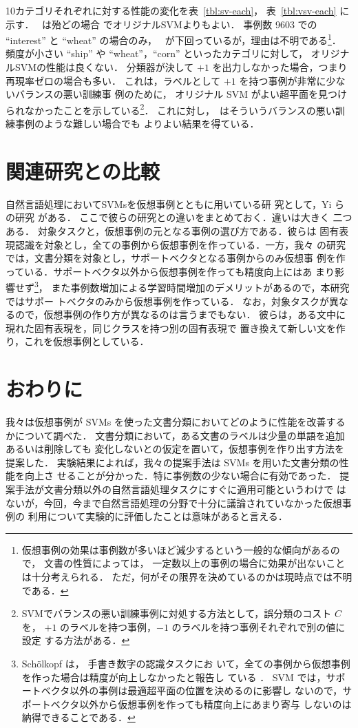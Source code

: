 10カテゴリそれぞれに対する性能の変化を表~\ref{tbl:sv-each}，
表~\ref{tbl:vsv-each} に示す．
\SVMFourVSVs\ は殆どの場合
でオリジナルSVMよりもよい．
事例数 9603 での ``interest'' と ``wheat'' の場合のみ，
\SVMFourVSVs\ が下回っているが，理由は不明である\footnote{
仮想事例の効果は事例数が多いほど減少するという一般的な傾向があるので，
文書の性質によっては，
一定数以上の事例の場合に効果が出ないことは十分考えられる．
ただ，何がその限界を決めているのかは現時点では不明である．
}．
頻度が小さい ``ship'' や ``wheat''，``corn'' といったカテゴリに対して，
オリジナルSVMの性能は良くない．
分類器が決して $+1$ を出力しなかった場合，つまり再現率ゼロの場合も多い．
これは，ラベルとして $+1$ を持つ事例が非常に少ないバランスの悪い訓練事
例のために，
オリジナル SVM がよい超平面を見つけられなかったことを示している\footnote{
SVMでバランスの悪い訓練事例に対処する方法として，誤分類のコスト $C$ を，
$+1$ のラベルを持つ事例，$-1$ のラベルを持つ事例それぞれで別の値に設定
する方法がある\cite{Morik1999}．
}．
これに対し，\SVMFourVSVs\ はそういうバランスの悪い訓練事例のような難しい場合でも
よりよい結果を得ている．



\section{関連研究との比較}
自然言語処理においてSVMsを仮想事例とともに用いている研
究として，Yi らの研究 \cite{Yi2004} がある．
ここで彼らの研究との違いをまとめておく．違いは大きく
二つある．
対象タスクと，仮想事例の元となる事例の選び方である．彼らは
固有表現認識を対象とし，全ての事例から仮想事例を作っている．一方，我々
の研究では，文書分類を対象とし，サポートベクタとなる事例からのみ仮想事
例を作っている．サポートベクタ以外から仮想事例を作っても精度向上にはあ
まり影響せず\footnote{
Sch\"{o}lkopf は，
手書き数字の認識タスクにお
いて，全ての事例から仮想事例を作った場合は精度が向上しなかったと報告し
ている \cite[page 112]{Schoelkopf1997}．
SVM では，サポートベクタ以外の事例は最適超平面の位置を決めるのに影響し
ないので，サポートベクタ以外から仮想事例を作っても精度向上にあまり寄与
しないのは納得できることである．
}，
また事例数増加による学習時間増加のデメリットがあるので，本研究ではサポー
トベクタのみから仮想事例を作っている．
なお，対象タスクが異なるので，仮想事例の作り方が異なるのは言うまでもない．
彼らは，ある文中に現れた固有表現を，同じクラスを持つ別の固有表現で
置き換えて新しい文を作り，これを仮想事例としている．


\section{おわりに}
我々は仮想事例が SVMs を使った文書分類においてどのように性能を改善する
かについて調べた．
文書分類において，ある文書のラベルは少量の単語を追加あるいは削除しても
変化しないとの仮定を置いて，仮想事例を作り出す方法を提案した．
実験結果によれば，我々の提案手法は SVMs を用いた文書分類の性能を向上さ
せることが分かった．特に事例数の少ない場合に有効であった．
提案手法が文書分類以外の自然言語処理タスクにすぐに適用可能というわけで
はないが，今回，今まで自然言語処理の分野で十分に議論されていなかった仮想事例の
利用について実験的に評価したことは意味があると言える．

